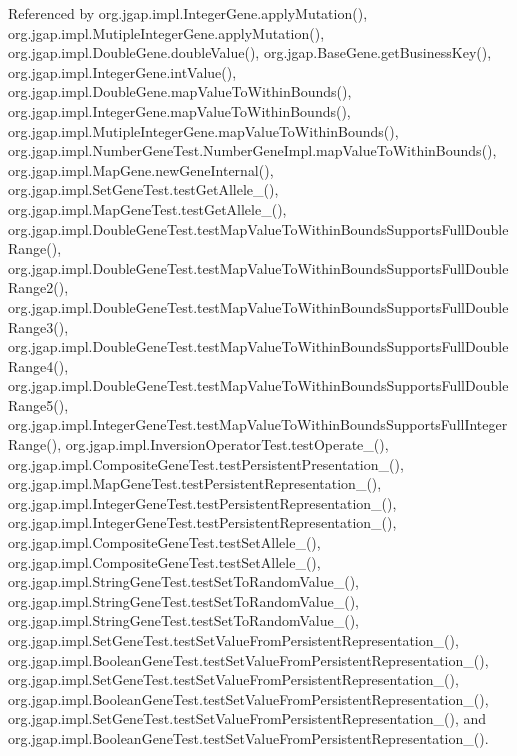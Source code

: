 Referenced by org.\-jgap.\-impl.\-Integer\-Gene.\-apply\-Mutation(), org.\-jgap.\-impl.\-Mutiple\-Integer\-Gene.\-apply\-Mutation(), org.\-jgap.\-impl.\-Double\-Gene.\-double\-Value(), org.\-jgap.\-Base\-Gene.\-get\-Business\-Key(), org.\-jgap.\-impl.\-Integer\-Gene.\-int\-Value(), org.\-jgap.\-impl.\-Double\-Gene.\-map\-Value\-To\-Within\-Bounds(), org.\-jgap.\-impl.\-Integer\-Gene.\-map\-Value\-To\-Within\-Bounds(), org.\-jgap.\-impl.\-Mutiple\-Integer\-Gene.\-map\-Value\-To\-Within\-Bounds(), org.\-jgap.\-impl.\-Number\-Gene\-Test.\-Number\-Gene\-Impl.\-map\-Value\-To\-Within\-Bounds(), org.\-jgap.\-impl.\-Map\-Gene.\-new\-Gene\-Internal(), org.\-jgap.\-impl.\-Set\-Gene\-Test.\-test\-Get\-Allele\-\_(), org.\-jgap.\-impl.\-Map\-Gene\-Test.\-test\-Get\-Allele\-\_(), org.\-jgap.\-impl.\-Double\-Gene\-Test.\-test\-Map\-Value\-To\-Within\-Bounds\-Supports\-Full\-Double\-Range(), org.\-jgap.\-impl.\-Double\-Gene\-Test.\-test\-Map\-Value\-To\-Within\-Bounds\-Supports\-Full\-Double\-Range2(), org.\-jgap.\-impl.\-Double\-Gene\-Test.\-test\-Map\-Value\-To\-Within\-Bounds\-Supports\-Full\-Double\-Range3(), org.\-jgap.\-impl.\-Double\-Gene\-Test.\-test\-Map\-Value\-To\-Within\-Bounds\-Supports\-Full\-Double\-Range4(), org.\-jgap.\-impl.\-Double\-Gene\-Test.\-test\-Map\-Value\-To\-Within\-Bounds\-Supports\-Full\-Double\-Range5(), org.\-jgap.\-impl.\-Integer\-Gene\-Test.\-test\-Map\-Value\-To\-Within\-Bounds\-Supports\-Full\-Integer\-Range(), org.\-jgap.\-impl.\-Inversion\-Operator\-Test.\-test\-Operate\-\_(), org.\-jgap.\-impl.\-Composite\-Gene\-Test.\-test\-Persistent\-Presentation\-\_(), org.\-jgap.\-impl.\-Map\-Gene\-Test.\-test\-Persistent\-Representation\-\_(), org.\-jgap.\-impl.\-Integer\-Gene\-Test.\-test\-Persistent\-Representation\-\_(), org.\-jgap.\-impl.\-Integer\-Gene\-Test.\-test\-Persistent\-Representation\-\_(), org.\-jgap.\-impl.\-Composite\-Gene\-Test.\-test\-Set\-Allele\-\_(), org.\-jgap.\-impl.\-Composite\-Gene\-Test.\-test\-Set\-Allele\-\_(), org.\-jgap.\-impl.\-String\-Gene\-Test.\-test\-Set\-To\-Random\-Value\-\_(), org.\-jgap.\-impl.\-String\-Gene\-Test.\-test\-Set\-To\-Random\-Value\-\_(), org.\-jgap.\-impl.\-String\-Gene\-Test.\-test\-Set\-To\-Random\-Value\-\_(), org.\-jgap.\-impl.\-Set\-Gene\-Test.\-test\-Set\-Value\-From\-Persistent\-Representation\-\_(), org.\-jgap.\-impl.\-Boolean\-Gene\-Test.\-test\-Set\-Value\-From\-Persistent\-Representation\-\_(), org.\-jgap.\-impl.\-Set\-Gene\-Test.\-test\-Set\-Value\-From\-Persistent\-Representation\-\_(), org.\-jgap.\-impl.\-Boolean\-Gene\-Test.\-test\-Set\-Value\-From\-Persistent\-Representation\-\_(), org.\-jgap.\-impl.\-Set\-Gene\-Test.\-test\-Set\-Value\-From\-Persistent\-Representation\-\_(), and org.\-jgap.\-impl.\-Boolean\-Gene\-Test.\-test\-Set\-Value\-From\-Persistent\-Representation\-\_().




